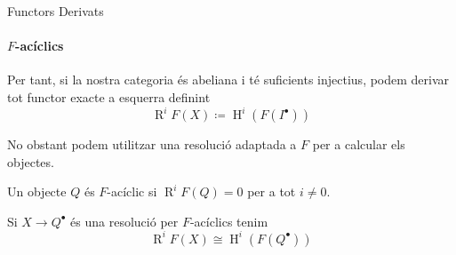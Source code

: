 \documentclass[notheorems, aspectratio=169]{beamer}
\begin{document}
\begin{frame}[fragile]{Functors Derivats}
  \framesubtitle{\(F\)-acíclics}
   {
    Per tant, si la nostra categoria és abeliana i té suficients injectius, podem derivar tot functor exacte a esquerra definint
    \begin{equation*}
      \operatorname{R}^{i}F(X) \coloneq \operatorname{H}^{i}(F(I^{\bullet}))
    \end{equation*}
  }

   {
    No obstant podem utilitzar una resolució adaptada a \(F\) per a calcular els objectes.
  }

   {
    \begin{definition}
      Un objecte \(Q\) és \alert<3>{\(F\)-acíclic} si \(\operatorname{R}^{i}F(Q) = 0\) per a tot \(i \neq 0\).
    \end{definition}

    Si \(X \to Q^{\bullet}\) és una resolució per \(F\)-acíclics tenim
    \begin{equation*}
      \operatorname{R}^{i}F(X) \cong \operatorname{H}^{i}(F(Q^{\bullet}))
    \end{equation*}
  }
\end{frame}
\end{document}
